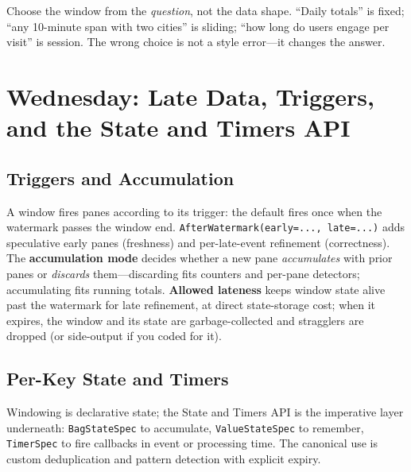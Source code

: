 \begin{tipbox}
Choose the window from the \emph{question}, not the data shape. ``Daily totals'' is fixed; ``any 10-minute span with two cities'' is sliding; ``how long do users engage per visit'' is session. The wrong choice is not a style error---it changes the answer.
\end{tipbox}

\section{Wednesday: Late Data, Triggers, and the State and Timers API}

\subsection{Triggers and Accumulation}
A window fires panes according to its trigger: the default fires once when the watermark passes the window end. \texttt{AfterWatermark(early=..., late=...)} adds speculative early panes (freshness) and per-late-event refinement (correctness). The \textbf{accumulation mode} decides whether a new pane \emph{accumulates} with prior panes or \emph{discards} them---discarding fits counters and per-pane detectors; accumulating fits running totals. \textbf{Allowed lateness} keeps window state alive past the watermark for late refinement, at direct state-storage cost; when it expires, the window and its state are garbage-collected and stragglers are dropped (or side-output if you coded for it).

\subsection{Per-Key State and Timers}
Windowing is declarative state; the State and Timers API is the imperative layer underneath: \texttt{BagStateSpec} to accumulate, \texttt{ValueStateSpec} to remember, \texttt{TimerSpec} to fire callbacks in event or processing time. The canonical use is custom deduplication and pattern detection with explicit expiry.

